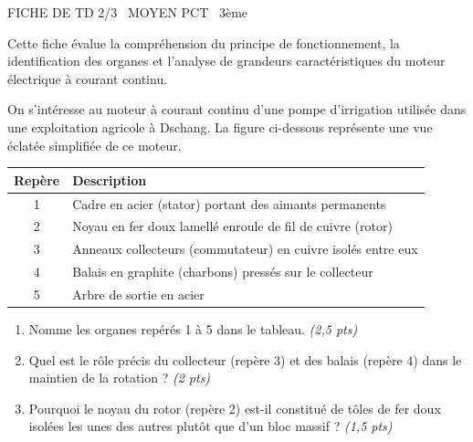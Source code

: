 \documentclass[11pt]{article}
\begin{document}
\begin{tcolorbox}[enhanced,colback=popink,colframe=popink,arc=10pt,boxrule=0pt,left=12pt,right=12pt,top=9pt,bottom=9pt]
{\color{white}\popxbold\small FICHE DE TD 2/3 \textbullet\ MOYEN \hfill PCT \textbullet\ 3ème\par}
\end{tcolorbox}
\vspace{4pt}
Cette fiche évalue la compréhension du principe de fonctionnement, la identification des organes et l'analyse de grandeurs caractéristiques du moteur électrique à courant continu.

\begin{exercice}
On s'intéresse au moteur à courant continu d'une pompe d'irrigation utilisée dans une exploitation agricole à Dschang. La figure ci-dessous représente une vue éclatée simplifiée de ce moteur.

\begin{center}
\begin{tabular}{|c|l|}
\hline
\textbf{Repère} & \textbf{Description} \\
\hline
1 & Cadre en acier (stator) portant des aimants permanents \\
2 & Noyau en fer doux lamellé enroule de fil de cuivre (rotor) \\
3 & Anneaux collecteurs (commutateur) en cuivre isolés entre eux \\
4 & Balais en graphite (charbons) pressés sur le collecteur \\
5 & Arbre de sortie en acier \\
\hline
\end{tabular}
\end{center}

\begin{enumerate}
    \item Nomme les organes repérés 1 à 5 dans le tableau. \textit{(2,5 pts)}
    \item Quel est le rôle précis du collecteur (repère 3) et des balais (repère 4) dans le maintien de la rotation ? \textit{(2 pts)}
    \item Pourquoi le noyau du rotor (repère 2) est-il constitué de tôles de fer doux isolées les unes des autres plutôt que d'un bloc massif ? \textit{(1,5 pts)}
\end{enumerate}
\end{exercice}
\end{document}

